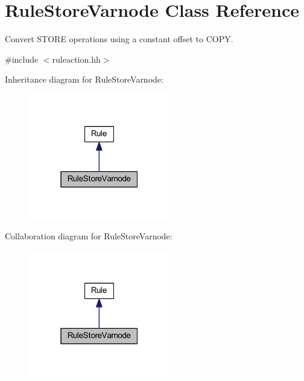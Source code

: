 \hypertarget{class_rule_store_varnode}{}\section{Rule\+Store\+Varnode Class Reference}
\label{class_rule_store_varnode}


Convert S\+T\+O\+RE operations using a constant offset to C\+O\+PY.  




{\ttfamily \#include $<$ruleaction.\+hh$>$}



Inheritance diagram for Rule\+Store\+Varnode\+:
\nopagebreak
\begin{figure}[H]
\begin{center}
\leavevmode
\includegraphics[width=175pt]{class_rule_store_varnode__inherit__graph}
\end{center}
\end{figure}


Collaboration diagram for Rule\+Store\+Varnode\+:
\nopagebreak
\begin{figure}[H]
\begin{center}
\leavevmode
\includegraphics[width=175pt]{class_rule_store_varnode__coll__graph}
\end{center}
\end{figure}
